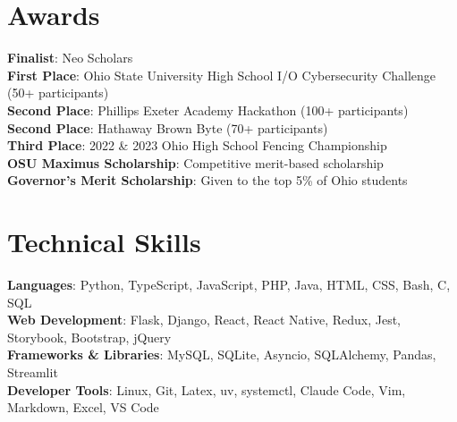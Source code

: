 \documentclass[letterpaper,11pt]{article}
\begin{document}
\section{Awards}
\begin{itemize}[leftmargin=0.15in, label={}]
    \small{
    \item{
        \textbf{Finalist}{: Neo Scholars} \\
        \textbf{First Place}{: Ohio State University High School I/O Cybersecurity Challenge (50+ participants)} \\
        \textbf{Second Place}{: Phillips Exeter Academy Hackathon (100+ participants)} \\
        \textbf{Second Place}{: Hathaway Brown Byte (70+ participants)} \\
        \textbf{Third Place}{: 2022 \& 2023 Ohio High School Fencing Championship} \\
        \textbf{OSU Maximus Scholarship}{: Competitive merit-based scholarship} \\
        \textbf{Governor's Merit Scholarship}{: Given to the top 5\% of Ohio students} \\
    }}
\end{itemize}

\section{Technical Skills}
\begin{itemize}[leftmargin=0.15in, label={}]
    \small{
    \item{
        \textbf{Languages}{: Python, TypeScript, JavaScript, PHP, Java, HTML, CSS, Bash, C, SQL} \\
        \textbf{Web Development}{: Flask, Django, React, React Native, Redux, Jest, Storybook, Bootstrap, jQuery} \\
        \textbf{Frameworks \& Libraries}{: MySQL, SQLite, Asyncio, SQLAlchemy, Pandas, Streamlit} \\
        \textbf{Developer Tools}{: Linux, Git, Latex, uv, systemctl, Claude Code, Vim, Markdown, Excel, VS Code} \\
    }}
\end{itemize}

\end{document}
